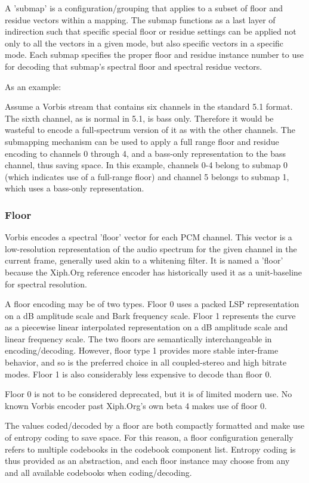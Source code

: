 A 'submap' is a configuration/grouping that applies to a subset of
floor and residue vectors within a mapping.  The submap functions as a
last layer of indirection such that specific special floor or residue
settings can be applied not only to all the vectors in a given mode,
but also specific vectors in a specific mode.  Each submap specifies
the proper floor and residue instance number to use for decoding that
submap's spectral floor and spectral residue vectors.

As an example:

Assume a Vorbis stream that contains six channels in the standard 5.1
format.  The sixth channel, as is normal in 5.1, is bass only.
Therefore it would be wasteful to encode a full-spectrum version of it
as with the other channels.  The submapping mechanism can be used to
apply a full range floor and residue encoding to channels 0 through 4,
and a bass-only representation to the bass channel, thus saving space.
In this example, channels 0-4 belong to submap 0 (which indicates use
of a full-range floor) and channel 5 belongs to submap 1, which uses a
bass-only representation.


\subsubsection{Floor}

Vorbis encodes a spectral 'floor' vector for each PCM channel.  This
vector is a low-resolution representation of the audio spectrum for
the given channel in the current frame, generally used akin to a
whitening filter.  It is named a 'floor' because the Xiph.Org
reference encoder has historically used it as a unit-baseline for
spectral resolution.

A floor encoding may be of two types.  Floor 0 uses a packed LSP
representation on a dB amplitude scale and Bark frequency scale.
Floor 1 represents the curve as a piecewise linear interpolated
representation on a dB amplitude scale and linear frequency scale.
The two floors are semantically interchangeable in
encoding/decoding. However, floor type 1 provides more stable
inter-frame behavior, and so is the preferred choice in all
coupled-stereo and high bitrate modes.  Floor 1 is also considerably
less expensive to decode than floor 0.

Floor 0 is not to be considered deprecated, but it is of limited
modern use.  No known Vorbis encoder past Xiph.Org's own beta 4 makes
use of floor 0.

The values coded/decoded by a floor are both compactly formatted and
make use of entropy coding to save space.  For this reason, a floor
configuration generally refers to multiple codebooks in the codebook
component list.  Entropy coding is thus provided as an abstraction,
and each floor instance may choose from any and all available
codebooks when coding/decoding.


